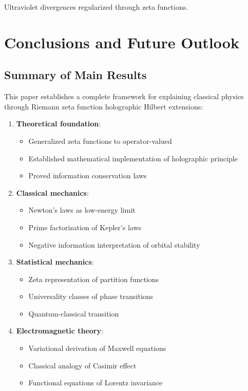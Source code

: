 \documentclass[12pt,a4paper]{article}
\begin{document}
Ultraviolet divergences regularized through zeta functions.

\section{Conclusions and Future Outlook}

\subsection{Summary of Main Results}

This paper establishes a complete framework for explaining classical physics through Riemann zeta function holographic Hilbert extensions:

\begin{enumerate}
\item \textbf{Theoretical foundation}:
   \begin{itemize}
   \item Generalized zeta functions to operator-valued
   \item Established mathematical implementation of holographic principle
   \item Proved information conservation laws
   \end{itemize}

\item \textbf{Classical mechanics}:
   \begin{itemize}
   \item Newton's laws as low-energy limit
   \item Prime factorization of Kepler's laws
   \item Negative information interpretation of orbital stability
   \end{itemize}

\item \textbf{Statistical mechanics}:
   \begin{itemize}
   \item Zeta representation of partition functions
   \item Universality classes of phase transitions
   \item Quantum-classical transition
   \end{itemize}

\item \textbf{Electromagnetic theory}:
   \begin{itemize}
   \item Variational derivation of Maxwell equations
   \item Classical analogy of Casimir effect
   \item Functional equations of Lorentz invariance
   \end{itemize}


\end{enumerate}
\end{document}

